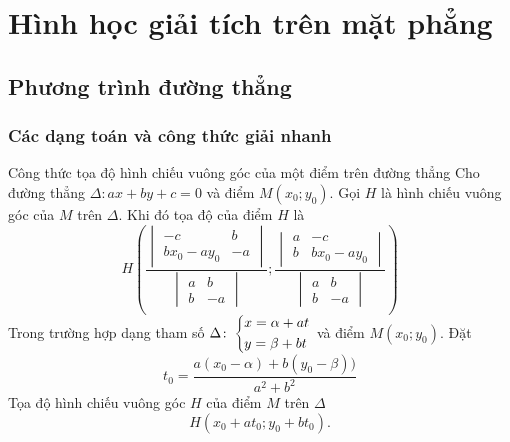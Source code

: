 \chapter{Hình học giải tích trên mặt phẳng}
\section{Phương trình đường thẳng}
\subsection{Các dạng toán và công thức giải nhanh}

\begin{dang}{Công thức tọa độ hình chiếu vuông góc của một điểm trên đường thẳng }
Cho đường thẳng $\Delta \colon ax+by+c=0$ và điểm $M\left (x_0;y_0\right )$. Gọi $H$ là hình chiếu vuông góc của $M$ trên $\Delta$. Khi đó tọa độ của điểm $H$ là 
\[H \left(  \dfrac{\begin{vmatrix}
-c & b  \\ 
bx_0-ay_0 & -a 
\end{vmatrix}}{\begin{vmatrix}
a & b  \\ 
b & -a 
\end{vmatrix}} ; \dfrac{\begin{vmatrix}
a & -c  \\ 
b & bx_0-ay_0
\end{vmatrix}}{\begin{vmatrix}
a & b  \\ 
b & -a 
\end{vmatrix}}\right) \]
Trong trường hợp dạng tham số $\Delta \colon \left\{\begin{aligned}&x=\alpha + at\\&y=\beta +bt\end{aligned}\right.$ và điểm $M\left (x_0;y_0\right )$. Đặt \[t_0 =\dfrac{a(x_0-\alpha) + b(y_0-\beta))}{a^2+b^2}\] Tọa độ hình chiếu vuông góc $H$ của điểm $M$ trên $\Delta$ 
\[ H \left ( x_0 + at_0; y_0+bt_0 \right ).\]
\end{dang}

